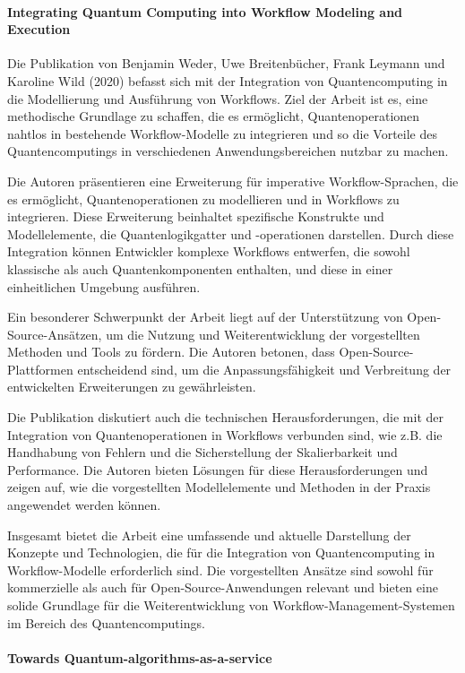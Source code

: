 \paragraph{Integrating Quantum Computing into Workflow Modeling and Execution}

Die Publikation von Benjamin Weder, Uwe Breitenbücher, Frank Leymann und Karoline Wild (2020) \cite{Weder_2020} befasst sich mit der 
Integration von Quantencomputing in die Modellierung und Ausführung von Workflows. Ziel der Arbeit ist es, eine 
methodische Grundlage zu schaffen, die es ermöglicht, Quantenoperationen nahtlos in bestehende Workflow-Modelle zu 
integrieren und so die Vorteile des Quantencomputings in verschiedenen Anwendungsbereichen nutzbar zu machen.

Die Autoren präsentieren eine Erweiterung für imperative Workflow-Sprachen, die es ermöglicht, Quantenoperationen 
zu modellieren und in Workflows zu integrieren. Diese Erweiterung beinhaltet spezifische Konstrukte und Modellelemente, 
die Quantenlogikgatter und -operationen darstellen. Durch diese Integration können Entwickler komplexe Workflows entwerfen, 
die sowohl klassische als auch Quantenkomponenten enthalten, und diese in einer einheitlichen Umgebung ausführen.

Ein besonderer Schwerpunkt der Arbeit liegt auf der Unterstützung von Open-Source-Ansätzen, um die Nutzung und 
Weiterentwicklung der vorgestellten Methoden und Tools zu fördern. Die Autoren betonen, dass Open-Source-Plattformen 
entscheidend sind, um die Anpassungsfähigkeit und Verbreitung der entwickelten Erweiterungen zu gewährleisten.

Die Publikation diskutiert auch die technischen Herausforderungen, die mit der Integration von Quantenoperationen in 
Workflows verbunden sind, wie z.B. die Handhabung von Fehlern und die Sicherstellung der Skalierbarkeit und Performance. 
Die Autoren bieten Lösungen für diese Herausforderungen und zeigen auf, wie die vorgestellten Modellelemente und Methoden 
in der Praxis angewendet werden können.

Insgesamt bietet die Arbeit eine umfassende und aktuelle Darstellung der Konzepte und Technologien, die für die Integration 
von Quantencomputing in Workflow-Modelle erforderlich sind. Die vorgestellten Ansätze sind sowohl für kommerzielle als auch 
für Open-Source-Anwendungen relevant und bieten eine solide Grundlage für die Weiterentwicklung von Workflow-Management-Systemen 
im Bereich des Quantencomputings.

\paragraph{Towards Quantum-algorithms-as-a-service}

